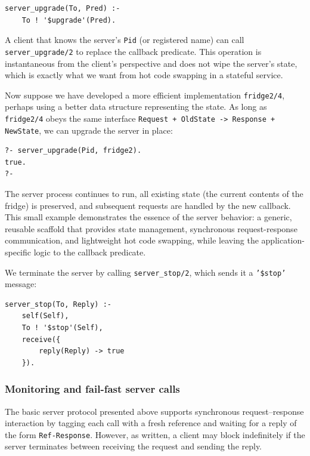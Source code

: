 \begin{verbatim}
server_upgrade(To, Pred) :-
    To ! '$upgrade'(Pred).
\end{verbatim}

\noindent A client that knows the server's \texttt{Pid} (or registered name) can call \texttt{server\_upgrade/2} to replace the callback predicate. This operation is instantaneous from the client's perspective and does not wipe the server's state, which is exactly what we want from hot code swapping in a stateful service.

Now suppose we have developed a more efficient implementation \texttt{fridge2/4}, perhaps using a better data structure representing the state. As long as \texttt{fridge2/4} obeys the same interface \texttt{Request\,+\,OldState\,->\,Response\,+\,NewState}, we can upgrade the server in place:

\begin{verbatim}
?- server_upgrade(Pid, fridge2).
true.
?-
\end{verbatim}

\noindent The server process continues to run, all existing state (the current contents of the fridge) is preserved, and subsequent requests are handled by the new callback. This small example demonstrates the essence of the server behavior: a generic, reusable scaffold that provides state management, synchronous request-response communication, and lightweight hot code swapping, while leaving the application-specific logic to the callback predicate.

We terminate the server by calling \texttt{server\_stop/2}, which sends it a \texttt{'\$stop'} message:

\begin{verbatim}
server_stop(To, Reply) :-
    self(Self),
    To ! '$stop'(Self),
    receive({
        reply(Reply) -> true
    }).
\end{verbatim}


\subsubsection{Monitoring and fail-fast server calls}

The basic server protocol presented above supports synchronous request--response interaction by tagging each call with a fresh reference and waiting for a reply of the form \texttt{Ref-Response}. However, as written, a client may block indefinitely if the server terminates between receiving the request and sending the reply.

